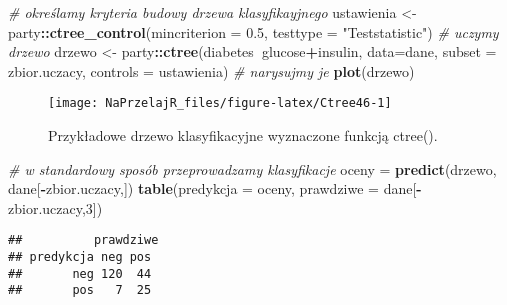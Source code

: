 \documentclass[polish,]{book}
\newenvironment{Shaded}{\begin{snugshade}}{\end{snugshade}}
\newcommand{\CommentTok}[1]{\textcolor[rgb]{0.56,0.35,0.01}{\textit{#1}}}
\newcommand{\DataTypeTok}[1]{\textcolor[rgb]{0.13,0.29,0.53}{#1}}
\newcommand{\DecValTok}[1]{\textcolor[rgb]{0.00,0.00,0.81}{#1}}
\newcommand{\FloatTok}[1]{\textcolor[rgb]{0.00,0.00,0.81}{#1}}
\newcommand{\KeywordTok}[1]{\textcolor[rgb]{0.13,0.29,0.53}{\textbf{#1}}}
\newcommand{\NormalTok}[1]{#1}
\newcommand{\OperatorTok}[1]{\textcolor[rgb]{0.81,0.36,0.00}{\textbf{#1}}}
\newcommand{\StringTok}[1]{\textcolor[rgb]{0.31,0.60,0.02}{#1}}
\begin{document}
\begin{Shaded}
\begin{Highlighting}[]
\CommentTok{# określamy kryteria budowy drzewa klasyfikayjnego}
\NormalTok{ustawienia <-}\StringTok{ }\NormalTok{party}\OperatorTok{::}\KeywordTok{ctree_control}\NormalTok{(}\DataTypeTok{mincriterion =} \FloatTok{0.5}\NormalTok{, }\DataTypeTok{testtype =} \StringTok{"Teststatistic"}\NormalTok{)}
\CommentTok{# uczymy drzewo}
\NormalTok{drzewo <-}\StringTok{ }\NormalTok{party}\OperatorTok{::}\KeywordTok{ctree}\NormalTok{(diabetes}\OperatorTok{~}\NormalTok{glucose}\OperatorTok{+}\NormalTok{insulin,}
                       \DataTypeTok{data=}\NormalTok{dane, }\DataTypeTok{subset =}\NormalTok{ zbior.uczacy, }\DataTypeTok{controls =}\NormalTok{ ustawienia)}
\CommentTok{# narysujmy je}
\KeywordTok{plot}\NormalTok{(drzewo)}
\end{Highlighting}
\end{Shaded}

\begin{figure}[h]

{\centering \texttt{[image: NaPrzelajR\_files/figure-latex/Ctree46-1]} 

}

\caption{Przykładowe drzewo klasyfikacyjne wyznaczone funkcją ctree().}\label{fig:Ctree46}
\end{figure}

\begin{Shaded}
\begin{Highlighting}[]
\CommentTok{# w standardowy sposób przeprowadzamy klasyfikacje}
\NormalTok{oceny =}\StringTok{ }\KeywordTok{predict}\NormalTok{(drzewo, dane[}\OperatorTok{-}\NormalTok{zbior.uczacy,])}
\KeywordTok{table}\NormalTok{(}\DataTypeTok{predykcja =}\NormalTok{ oceny, }\DataTypeTok{prawdziwe =}\NormalTok{ dane[}\OperatorTok{-}\NormalTok{zbior.uczacy,}\DecValTok{3}\NormalTok{])}
\end{Highlighting}
\end{Shaded}

\begin{verbatim}
##          prawdziwe
## predykcja neg pos
##       neg 120  44
##       pos   7  25
\end{verbatim}
\end{document}
